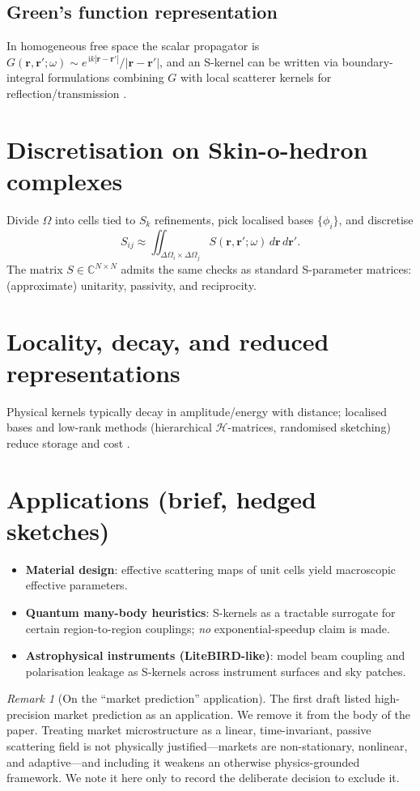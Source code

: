 \documentclass[11pt]{article}
\theoremstyle{plain}
\theoremstyle{definition}
\theoremstyle{remark}
\newtheorem{remark}[theorem]{Remark}
\newcommand{\Om}{\Omega}
\begin{document}
\subsection{Green's function representation}
In homogeneous free space the scalar propagator is
$G(\mathbf r,\mathbf r';\omega)\sim e^{\,\mathrm i k|\mathbf r-\mathbf r'|}/|\mathbf r-\mathbf r'|$,
and an S-kernel can be written via boundary-integral formulations combining $G$
with local scatterer kernels for reflection/transmission \citep{colton2013inverse}.

\section{Discretisation on Skin-o-hedron complexes}
Divide $\Om$ into cells tied to $S_k$ refinements, pick localised bases
$\{\phi_i\}$, and discretise
\[
S_{ij}\approx \iint_{\Delta\Om_i\times\Delta\Om_j}
S(\mathbf r,\mathbf r';\omega)\,d\mathbf r\,d\mathbf r'.
\]
The matrix $S\in\mathbb C^{N\times N}$ admits the same checks as standard
S-parameter matrices: (approximate) unitarity, passivity, and reciprocity.

\section{Locality, decay, and reduced representations}
Physical kernels typically decay in amplitude/energy with distance; localised
bases and low-rank methods (hierarchical $\mathcal H$-matrices, randomised
sketching) reduce storage and cost \citep{hackbusch1999sparse}.

\section{Applications (brief, hedged sketches)}
\begin{itemize}
  \item \textbf{Material design}: effective scattering maps of unit cells yield
    macroscopic effective parameters.
  \item \textbf{Quantum many-body heuristics}: S-kernels as a tractable surrogate
    for certain region-to-region couplings; \emph{no} exponential-speedup claim
    is made.
  \item \textbf{Astrophysical instruments (LiteBIRD-like)}: model beam coupling
    and polarisation leakage as S-kernels across instrument surfaces and sky
    patches.
\end{itemize}

\begin{remark}[On the ``market prediction'' application]
The first draft listed high-precision market prediction as an application. We
remove it from the body of the paper. Treating market microstructure as a linear,
time-invariant, passive scattering field is not physically justified---markets
are non-stationary, nonlinear, and adaptive---and including it weakens an
otherwise physics-grounded framework. We note it here only to record the
deliberate decision to exclude it.
\end{remark}
\end{document}
